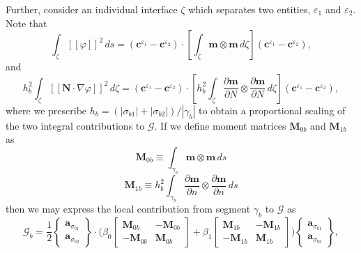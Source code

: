 Further, consider an individual interface $\zeta$ which separates two entities, $\varepsilon_{1}$ and $\varepsilon_{2}$. Note that
\begin{equation}
        \int_{\zeta} [\![ \varphi ]\!]^2 \, ds = (\mathbf{c}^{\varepsilon_{1}} - \mathbf{c}^{\varepsilon_{2}}) \cdot \left[ \int_{\zeta} \mathbf{m} \otimes \mathbf{m} \, d \zeta \right] (\mathbf{c}^{\varepsilon_{1}} - \mathbf{c}^{\varepsilon_{2}}),
\end{equation}
and
\begin{equation}
        h_b^2 \int_{\zeta} [\![ \mathbf{N} \cdot \nabla \varphi ]\!]^2 \, d \zeta = (\mathbf{c}^{\varepsilon_{1}} - \mathbf{c}^{\varepsilon_{2}}) \cdot \left[ h_b^2 \int_{\zeta} \frac{\partial \mathbf{m}}{\partial N} \otimes \frac{\partial \mathbf{m}}{\partial N} \, d \zeta \right] (\mathbf{c}^{\varepsilon_{1}} - \mathbf{c}^{\varepsilon_{2}}),
\end{equation}
where we prescribe $h_b = (|\sigma_{b1}| + |\sigma_{b2}|)/|\gamma_{b}|$ to obtain a proportional scaling of the two integral contributions to $\mathcal{G}$. If we define moment matrices $\mathbf{M}_{0b}$ and $\mathbf{M}_{1b}$ as
\begin{equation}
        \mathbf{M}_{0b} \equiv \int_{\gamma_b} \mathbf{m} \otimes \mathbf{m} \, ds
\end{equation}
\begin{equation}
        \mathbf{M}_{1b} \equiv h_b^2 \int_{\gamma_b} \frac{\partial \mathbf{m}}{\partial n} \otimes \frac{\partial \mathbf{m}}{\partial n} \, ds
\end{equation}
then we may express the local contribution from segment $\gamma_b$ to $\mathcal{G}$ as
\begin{equation}
        \mathcal{G}_b = \frac{1}{2} \left\{ \begin{array}{c} \mathbf{a}_{\sigma_{b1}} \\ \mathbf{a}_{\sigma_{b2}} \end{array} \right\} \cdot \bigg( \beta_0 \left[ \begin{array}{cc} \mathbf{M}_{0b} & - \mathbf{M}_{0b} \\ - \mathbf{M}_{0b} & \mathbf{M}_{0b} \end{array} \right] + \beta_1 \left[ \begin{array}{cc} \mathbf{M}_{1b} & - \mathbf{M}_{1b} \\ - \mathbf{M}_{1b} & \mathbf{M}_{1b} \end{array} \right] \bigg) \left\{ \begin{array}{c} \mathbf{a}_{\sigma_{b1}} \\ \mathbf{a}_{\sigma_{b2}} \end{array} \right\},
\end{equation}
